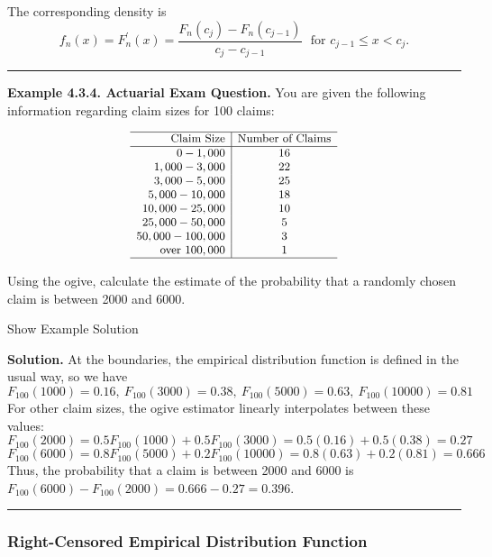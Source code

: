 \documentclass[]{book}
\theoremstyle{definition}
\theoremstyle{definition}
\theoremstyle{definition}
\theoremstyle{remark}
\begin{document}
The corresponding density is
\[f_n(x) = F^{\prime}_n(x) = \frac{F_n(c_j)-F_n(c_{j-1})}{c_j - c_{j-1}} \ \ \  \text{for } c_{j-1} \le x < c_j .\]

\begin{center}\rule{0.5\linewidth}{\linethickness}\end{center}

\textbf{Example 4.3.4. Actuarial Exam Question.} You are given the
following information regarding claim sizes for 100 claims:

\[
{\small
\begin{array}{r|c}
\hline
\text{Claim Size} &  \text{Number of Claims} \\
\hline
0 - 1,000 & 16 \\
1,000 - 3,000 & 22 \\
3,000 - 5,000 & 25 \\
5,000 - 10,000 & 18 \\
10,000 - 25,000 & 10 \\
25,000 - 50,000 & 5 \\
50,000 - 100,000 & 3 \\
\text{over  } 100,000 & 1 \\
\hline
\end{array}
}
\]

Using the ogive, calculate the estimate of the probability that a
randomly chosen claim is between 2000 and 6000.

Show Example Solution

\hypertarget{toggleExampleSelect.3.4}{}
\textbf{Solution.} At the boundaries, the empirical distribution
function is defined in the usual way, so we have
\[F_{100}(1000) = 0.16, \ F_{100}(3000)=0.38, \ F_{100}(5000)=0.63, \ F_{100}(10000)=0.81\]
For other claim sizes, the ogive estimator linearly interpolates between
these values:
\[F_{100}(2000) = 0.5F_{100}(1000) + 0.5F_{100}(3000) = 0.5(0.16)+0.5(0.38)=0.27\]
\[F_{100}(6000)=0.8F_{100}(5000)+0.2F_{100}(10000) = 0.8(0.63)+0.2(0.81)=0.666\]
Thus, the probability that a claim is between 2000 and 6000 is
\(F_{100}(6000) - F_{100}(2000) = 0.666-0.27 = 0.396\).

\begin{center}\rule{0.5\linewidth}{\linethickness}\end{center}

\subsubsection{Right-Censored Empirical Distribution
Function}\label{right-censored-empirical-distribution-function}
\end{document}
